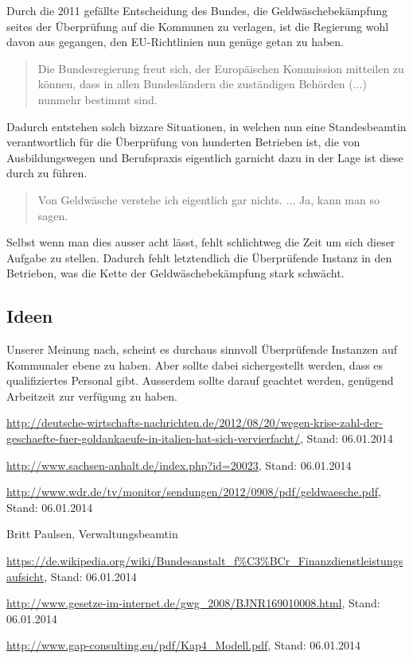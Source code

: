 \documentclass{article}
\begin{document}
            Durch die 2011 gefällte Entscheidung des Bundes, die Geldwäschebekämpfung seites der Überprüfung auf die Kommunen zu verlagen, ist die Regierung wohl davon aus gegangen, den EU-Richtlinien nun genüge getan zu haben.
            \begin{quote} Die Bundesregierung freut sich, der Europäischen Kommission mitteilen zu können, dass in allen Bundesländern die zuständigen Behörden (...) nunmehr bestimmt sind. \cite{EUZeugs} \end{quote}
            Dadurch entstehen solch bizzare Situationen, in welchen nun eine Standesbeamtin verantwortlich für die Überprüfung von hunderten Betrieben ist, die von Ausbildungswegen und Berufspraxis eigentlich garnicht dazu in der Lage ist diese durch zu führen. \begin{quote} Von Geldwäsche verstehe ich eigentlich gar nichts. ... Ja, kann man so sagen. \cite{Beatmin} \end{quote} Selbst wenn man dies ausser acht lässt, fehlt schlichtweg die Zeit um sich dieser Aufgabe zu stellen. Dadurch fehlt letztendlich die Überprüfende Instanz in den Betrieben, was die Kette der Geldwäschebekämpfung stark schwächt.

        \subsection[Ideen]{Ideen}

            Unserer Meinung nach, scheint es durchaus sinnvoll Überprüfende Instanzen auf Kommunaler ebene zu haben. Aber sollte dabei sichergestellt werden, dass es qualifiziertes Personal gibt. Ausserdem sollte darauf geachtet werden, genügend Arbeitzeit zur verfügung zu haben.

\newpage

    \begin{thebibliography}{9}

         \url{http://deutsche-wirtschafts-nachrichten.de/2012/08/20/wegen-krise-zahl-der-geschaefte-fuer-goldankaeufe-in-italien-hat-sich-vervierfacht/}, Stand: 06.01.2014

         \url{http://www.sachsen-anhalt.de/index.php?id=20023}, Stand: 06.01.2014

         \url{http://www.wdr.de/tv/monitor/sendungen/2012/0908/pdf/geldwaesche.pdf}, Stand: 06.01.2014

         Britt Paulsen, Verwaltungsbeamtin

         \url{https://de.wikipedia.org/wiki/Bundesanstalt_f%C3%BCr_Finanzdienstleistungsaufsicht}, Stand: 06.01.2014

         \url{http://www.gesetze-im-internet.de/gwg_2008/BJNR169010008.html}, Stand: 06.01.2014

         \url{http://www.gap-consulting.eu/pdf/Kap4_Modell.pdf}, Stand: 06.01.2014
        
    \end{thebibliography}
\end{document}
